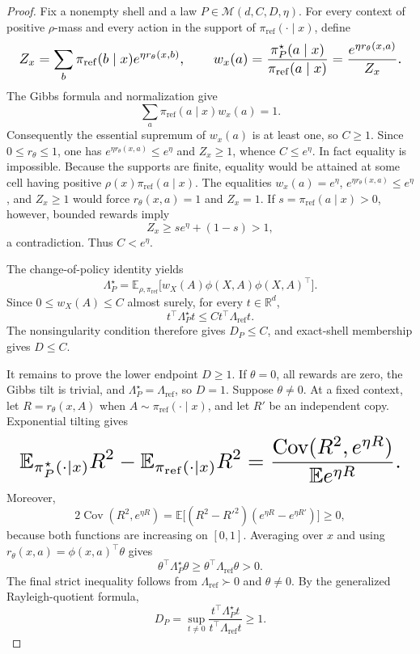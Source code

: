 \documentclass{article}
\begin{document}
\begin{proof}
Fix a nonempty shell and a law \(P\in\mathcal M(d,C,D,\eta)\). For every context of positive \(\rho\)-mass and every action in the support of \(\pi_{\mathrm{ref}}(\cdot\mid x)\), define
\[
\makebox[\linewidth][c]{\resizebox{0.98\linewidth}{!}{\(\displaystyle Z_x=\sum_b\pi_{\mathrm{ref}}(b\mid x)e^{\eta r_\theta(x,b)},\qquad
w_x(a)=\frac{\pi_P^\star(a\mid x)}{\pi_{\mathrm{ref}}(a\mid x)}
=\frac{e^{\eta r_\theta(x,a)}}{Z_x}.\)}}
\]
The Gibbs formula and normalization give
\[
\sum_a\pi_{\mathrm{ref}}(a\mid x)w_x(a)=1.
\]
Consequently the essential supremum of \(w_x(a)\) is at least one, so \(C\ge1\). Since \(0\le r_\theta\le1\), one has \(e^{\eta r_\theta(x,a)}\le e^\eta\) and \(Z_x\ge1\), whence \(C\le e^\eta\). In fact equality is impossible. Because the supports are finite, equality would be attained at some cell having positive \(\rho(x)\pi_{\mathrm{ref}}(a\mid x)\). The equalities \(w_x(a)=e^\eta\), \(e^{\eta r_\theta(x,a)}\le e^\eta\), and \(Z_x\ge1\) would force \(r_\theta(x,a)=1\) and \(Z_x=1\). If \(s=\pi_{\mathrm{ref}}(a\mid x)>0\), however, bounded rewards imply
\[
Z_x\ge s e^\eta+(1-s)>1,
\]
a contradiction. Thus \(C<e^\eta\).

The change-of-policy identity yields
\[
\Lambda_P^\star
=\mathbb E_{\rho,\pi_{\mathrm{ref}}}
\bigl[w_X(A)\phi(X,A)\phi(X,A)^\top\bigr].
\]
Since \(0\le w_X(A)\le C\) almost surely, for every \(t\in\mathbb R^d\),
\[
t^\top\Lambda_P^\star t
\le C t^\top\Lambda_{\mathrm{ref}}t.
\]
The nonsingularity condition therefore gives \(D_P\le C\), and exact-shell membership gives \(D\le C\).

It remains to prove the lower endpoint \(D\ge1\). If \(\theta=0\), all rewards are zero, the Gibbs tilt is trivial, and \(\Lambda_P^\star=\Lambda_{\mathrm{ref}}\), so \(D=1\). Suppose \(\theta\ne0\). At a fixed context, let \(R=r_\theta(x,A)\) when \(A\sim\pi_{\mathrm{ref}}(\cdot\mid x)\), and let \(R'\) be an independent copy. Exponential tilting gives
\[
\makebox[\linewidth][c]{\resizebox{0.98\linewidth}{!}{\(\displaystyle \mathbb E_{\pi_P^\star(\cdot\mid x)}R^2
-\mathbb E_{\pi_{\mathrm{ref}}(\cdot\mid x)}R^2
=\frac{\operatorname{Cov}(R^2,e^{\eta R})}{\mathbb E e^{\eta R}}.\)}}
\]
Moreover,
\[
2\operatorname{Cov}(R^2,e^{\eta R})
=\mathbb E\bigl[(R^2-R'^2)(e^{\eta R}-e^{\eta R'})\bigr]\ge0,
\]
because both functions are increasing on \([0,1]\). Averaging over \(x\) and using \(r_\theta(x,a)=\phi(x,a)^\top\theta\) gives
\[
\theta^\top\Lambda_P^\star\theta
\ge\theta^\top\Lambda_{\mathrm{ref}}\theta>0.
\]
The final strict inequality follows from \(\Lambda_{\mathrm{ref}}\succ0\) and \(\theta\ne0\). By the generalized Rayleigh-quotient formula,
\[
D_P=\sup_{t\ne0}\frac{t^\top\Lambda_P^\star t}{t^\top\Lambda_{\mathrm{ref}}t}\ge1.
\]


\end{proof}
\end{document}

